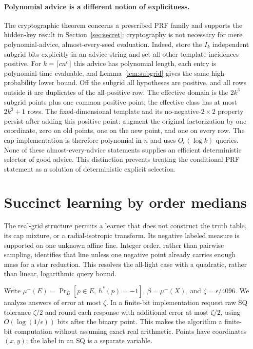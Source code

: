 \documentclass[11pt]{article}
\newcommand{\1}{\mathbf 1}
\begin{document}
\paragraph{Polynomial advice is a different notion of explicitness.}
The cryptographic theorem concerns a prescribed PRF family and supports the hidden-key result in Section~\ref{sec:secret}; cryptography is not necessary for mere polynomial-advice, almost-every-seed evaluation. Indeed, store the $I_k$ independent subgrid bits explicitly in an advice string and set all other template incidences positive. For $k=\lceil cn^c\rceil$ this advice has polynomial length, each entry is polynomial-time evaluable, and Lemma~\ref{lem:subgrid} gives the same high-probability lower bound. Off the subgrid all hypotheses are positive, and all rows outside it are duplicates of the all-positive row. The effective domain is the $2k^3$ subgrid points plus one common positive point; the effective class has at most $2k^3+1$ rows. The fixed-dimensional template and its no-negative-$2\times2$ property persist after adding this positive point: augment the original factorization by one coordinate, zero on old points, one on the new point, and one on every row. The cap implementation is therefore polynomial in $n$ and uses $O_\epsilon(\log k)$ queries. None of these almost-every-advice statements supplies an efficient deterministic selector of good advice. This distinction prevents treating the conditional PRF statement as a solution of deterministic explicit selection.



\section{Succinct learning by order medians}\label{sec:fast}
The real-grid structure permits a learner that does not construct the truth table, its cap mixture, or a radial-isotropic transform. Its negative labeled measure is supported on one unknown affine line. Integer order, rather than pairwise sampling, identifies that line unless one negative point already carries enough mass for a star reduction. This resolves the all-light case with a quadratic, rather than linear, logarithmic query bound.

Write $\mu^-(E)=\Pr_D[p\in E,\ h^*(p)=-1]$, $\beta=\mu^-(X)$, and $\zeta=\epsilon/4096$. We analyze answers of error at most $\zeta$. In a finite-bit implementation request raw SQ tolerance $\zeta/2$ and round each response with additional error at most $\zeta/2$, using $O(\log(1/\epsilon))$ bits after the binary point. This makes the algorithm a finite-bit computation without assuming exact real arithmetic. Points have coordinates $(x,y)$; the label in an SQ is a separate variable.
\end{document}
